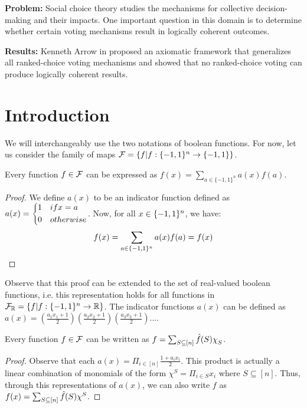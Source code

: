 \begin{question}
    \textbf{Problem: } Social choice theory studies the mechanisms for collective decision-making and their impacts. One important question in this domain is to determine whether certain voting mechanisms result in logically coherent outcomes.

    \textbf{Results: } Kenneth Arrow in \cite{RePEc:ucp:jpolec:v:58:y:1950:p:328} proposed an axiomatic framework that generalizes all ranked-choice voting mechanisms and showed that no ranked-choice voting can produce logically coherent results.
\end{question}

\begin{question}
    
\end{question}

\section{Introduction}

We will interchangeably use the two notations of boolean functions. For now, let us consider the family of maps $\mathcal{F} =\{f|{f} : {\{-1,1\}^n} \rightarrow {\{-1,1\}}\}$. 



\begin{lemma}
    Every function $f \in \mathcal{F}$ can be expressed as $f(x) = \sum_{a \in \{-1,1\}^n} a(x)f(a)$.
    \begin{proof}
        We define $a(x)$ to be an indicator function defined as $a(x) = \begin{dcases}1 & if x = a\\ 0 & otherwise\end{dcases}$. Now, for all $x \in \{-1,1\}^n$, we have:
        \[f(x) = \sum_{a \in \{-1,1\}^n} a(x)f(a) = f(x)\]
    \end{proof}
\end{lemma}

Observe that this proof can be extended to the set of real-valued boolean functions, i.e. this representation holds for all functions in $\mathcal{F}_{\mathbb{R}} = \{f|{f} : {\{-1,1\}^n} \rightarrow {\mathbb{R}}\}$. The indicator functions $a(x)$ can be defined as $a(x) = \left(\frac{a_1x_1+1}{2}\right)\left(\frac{a_2x_2+1}{2}\right)\left(\frac{a_3x_3+1}{2}\right)...$. 

\begin{lemma}\label{lemma: monomial representation}
    Every function $f \in \mathcal{F}$ can be written as $f = \sum_{S \subseteq [n]} \fhat(S)\chi_S$.

    \begin{proof}
        Observe that each $a(x) = \Pi_{i \in [n]} \frac{1+a_ix_i}{2}$. This product is actually a linear combination of monomials of the form $\chi^S = \Pi_{i \in S} x_i$ where $S \subseteq [n]$. Thus, through this representations of $a(x)$, we can also write $f$ as $f(x) = \sum_{S \subseteq [n]} \fhat(S)\chi^S$.
    \end{proof}
\end{lemma}

